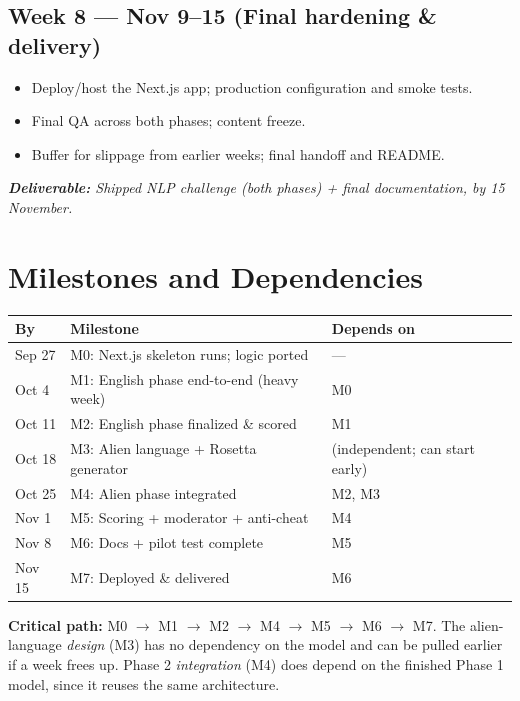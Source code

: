 \documentclass[a4]{article}
\newcommand{\deliv}[1]{\textit{\textbf{Deliverable:} #1}}
\begin{document}
\subsection*{Week 8 --- Nov 9--15 \quad (Final hardening \& delivery)}
\begin{itemize}[leftmargin=*, itemsep=1pt]
    \item Deploy/host the Next.js app; production configuration and smoke tests.
    \item Final QA across both phases; content freeze.
    \item Buffer for slippage from earlier weeks; final handoff and README.
\end{itemize}
\deliv{Shipped NLP challenge (both phases) + final documentation, by 15 November.}

\section{Milestones and Dependencies}

\begin{center}
\renewcommand{\arraystretch}{1.25}
\begin{tabularx}{\linewidth}{@{}p{1.2cm}p{3.2cm}X@{}}
\toprule
\textbf{By} & \textbf{Milestone} & \textbf{Depends on} \\
\midrule
Sep 27 & M0: Next.js skeleton runs; logic ported & --- \\
Oct 4  & M1: English phase end-to-end (heavy week) & M0 \\
Oct 11 & M2: English phase finalized \& scored & M1 \\
Oct 18 & M3: Alien language + Rosetta generator & (independent; can start early) \\
Oct 25 & M4: Alien phase integrated & M2, M3 \\
Nov 1  & M5: Scoring + moderator + anti-cheat & M4 \\
Nov 8  & M6: Docs + pilot test complete & M5 \\
Nov 15 & M7: Deployed \& delivered & M6 \\
\bottomrule
\end{tabularx}
\end{center}

\noindent\textbf{Critical path:} M0 $\rightarrow$ M1 $\rightarrow$ M2 $\rightarrow$
M4 $\rightarrow$ M5 $\rightarrow$ M6 $\rightarrow$ M7. The alien-language
\emph{design} (M3) has no dependency on the model and can be pulled earlier if a
week frees up. Phase 2 \emph{integration} (M4) does depend on the finished Phase 1
model, since it reuses the same architecture.
\end{document}
